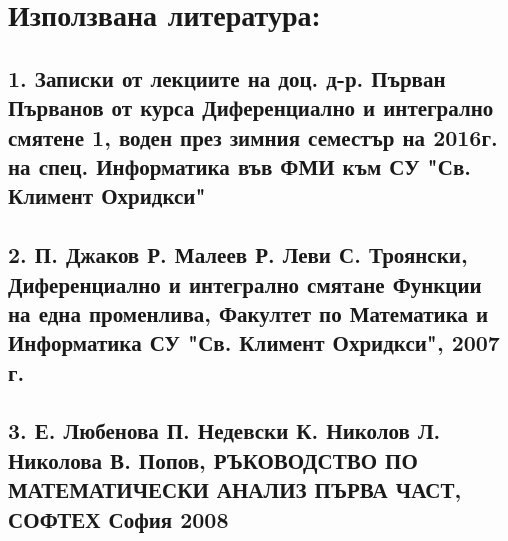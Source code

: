 \documentclass[12pt]{article}
\begin{document}
\section*{Използвана литература:}
\subsection*{1. Записки от лекциите на доц. д-р. Първан Първанов от курса Диференциално и интегрално смятене 1, воден през зимния семестър на 2016г. на спец. Информатика във ФМИ към СУ "Св. Климент Охридкси"}
\subsection*{2. П. Джаков Р. Малеев Р. Леви С. Троянски, Диференциално и интегрално смятане Функции на една променлива, Факултет по Математика и Информатика СУ "Св. Климент Охридкси", 2007 г.}
\subsection*{3. Е. Любенова П. Недевски К. Николов Л. Николова В. Попов, РЪКОВОДСТВО ПО МАТЕМАТИЧЕСКИ АНАЛИЗ ПЪРВА ЧАСТ, СОФТЕХ София 2008}
\end{document}
